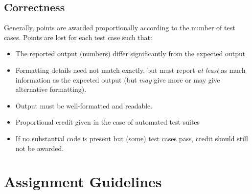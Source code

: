 \documentclass[12pt]{scrartcl}
\begin{document}
\subsection*{Correctness}

Generally, points are awarded proportionally according to the number of test cases.
Points are lost for each test case such that:

\begin{itemize}
  \item The reported output (numbers) differ significantly from the expected output
  \item Formatting details need not match exactly, but must report \emph{at least} as much information as the expected output (but \emph{may} give more or may give alternative formatting).
  \item Output must be well-formatted and readable.
  \item Proportional credit given in the case of automated test suites
  \item If no substantial code is present but (some) test cases pass, credit should still not be awarded.
\end{itemize}

\newpage

\section*{Assignment Guidelines}
\end{document}
